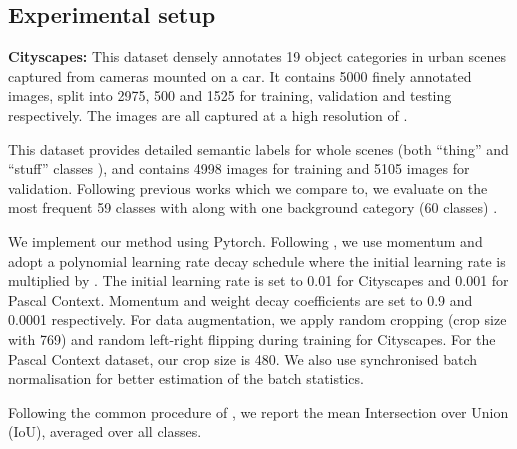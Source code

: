 \documentclass{bmvc2k}
\begin{document}
\subsection{Experimental setup}
\label{sec:exp_setup}

\textbf{Cityscapes:} 
This dataset \cite{Cityscapes} densely annotates 19 object categories in urban scenes captured from cameras mounted on a car.
It contains 5000 finely annotated images, split into 2975, 500 and 1525 for training, validation and testing respectively.
The images are all captured at a high resolution of .

This dataset \cite{mottaghi_cvpr14} provides detailed semantic labels for whole scenes (both ``thing'' and ``stuff'' classes \cite{forsyth1996finding}), and contains 4998 images for training and 5105 images for validation.
Following previous works which we compare to, we evaluate on the most frequent 59 classes with along with one background category (60 classes) \cite{mottaghi_cvpr14}.

  We implement our method using Pytorch. Following \cite{pspnet}, we use momentum and adopt a polynomial learning rate decay schedule where the initial learning rate is multiplied by . 
The initial learning rate is set to 0.01 for Cityscapes and 0.001 for Pascal Context. 
Momentum and weight decay coefficients are set to 0.9 and 0.0001 respectively. 
For data augmentation, we apply random cropping (crop size with 769) and random left-right flipping during training for Cityscapes. 
For the Pascal Context dataset, our crop size is 480. 
We also use synchronised batch normalisation for better estimation of the batch statistics.

 Following the common procedure of \cite{VOC,ADE20K,Cityscapes}, we report the mean Intersection over Union (IoU), averaged over all classes.
\end{document}
